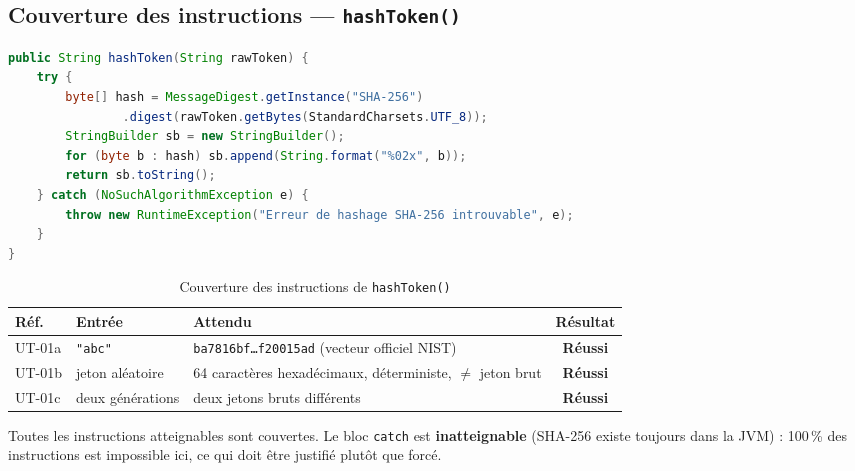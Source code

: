 \documentclass[12pt,a4paper]{report}
\newcommand{\ok}{\textcolor{okgreen}{\textbf{Réussi}}}
\begin{document}
\subsection{Couverture des instructions --- \texttt{hashToken()}}
\begin{lstlisting}[language=Java]
public String hashToken(String rawToken) {
    try {
        byte[] hash = MessageDigest.getInstance("SHA-256")
                .digest(rawToken.getBytes(StandardCharsets.UTF_8));
        StringBuilder sb = new StringBuilder();
        for (byte b : hash) sb.append(String.format("%02x", b));
        return sb.toString();
    } catch (NoSuchAlgorithmException e) {
        throw new RuntimeException("Erreur de hashage SHA-256 introuvable", e);
    }
}
\end{lstlisting}
\begin{table}[H]
\centering
\caption{Couverture des instructions de \texttt{hashToken()}}
\small
\begin{tabularx}{\textwidth}{@{}lp{3.3cm}Xc@{}}
\toprule
\rowcolor{evlight}\textbf{Réf.} & \textbf{Entrée} & \textbf{Attendu} & \textbf{Résultat}\\
\midrule
UT-01a & \texttt{"abc"} & \texttt{ba7816bf\ldots f20015ad} (vecteur officiel NIST) & \ok\\
UT-01b & jeton aléatoire & 64 caractères hexadécimaux, déterministe, $\neq$ jeton brut & \ok\\
UT-01c & deux générations & deux jetons bruts différents & \ok\\
\bottomrule
\end{tabularx}
\end{table}
Toutes les instructions atteignables sont couvertes. Le bloc \texttt{catch} est \textbf{inatteignable} (SHA-256 existe toujours dans la JVM) : 100\,\% des instructions est impossible ici, ce qui doit être justifié plutôt que forcé.
\end{document}
